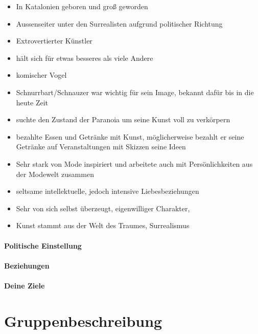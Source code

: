 \documentclass[12pt, a4paper, openany]{report}
\begin{document}
\begin{itemize}
  \item In Katalonien geboren und groß geworden
  \item Aussenseiter unter den Surrealisten aufgrund politischer Richtung
  \item Extrovertierter Künstler
  \item hält sich für etwas besseres als viele Andere
  \item komischer Vogel
  \item Schnurrbart/Schnauzer war wichtig für sein Image, bekannt dafür bis in die heute Zeit
  \item suchte den Zustand der Paranoia um seine Kunst voll zu verkörpern
  \item bezahlte Essen und Getränke mit Kunst, möglicherweise bezahlt er seine Getränke auf Veranstaltungen mit Skizzen seine Ideen
  \item Sehr stark von Mode inspiriert und arbeitete auch mit Persönlichkeiten aus der Modewelt zusammen
  \item seltsame intellektuelle, jedoch intensive Liebesbeziehungen 
  \item Sehr von sich selbst überzeugt, eigenwilliger Charakter, 
  \item Kunst stammt aus der Welt des Traumes, Surrealismus
\end{itemize}

\subsubsection{Politische Einstellung}

\subsubsection{Beziehungen}

\subsubsection{Deine Ziele}

\chapter{Gruppenbeschreibung}
\end{document}

